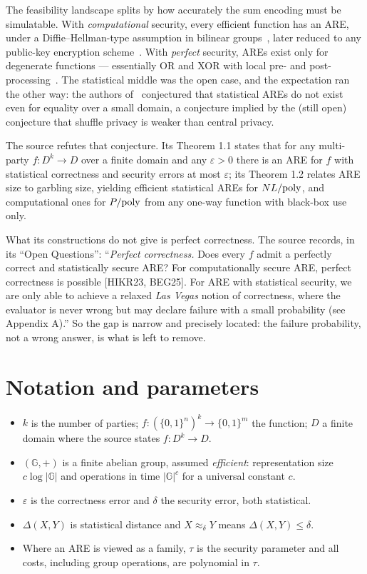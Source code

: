 \documentclass{aicr-conjecture}
\newcommand{\bits}{\{0,1\}}
\newcommand{\eps}{\varepsilon}
\newcommand{\Gr}{\mathbb{G}}
\begin{document}
The feasibility landscape splits by how accurately the sum encoding must
be simulatable. With \emph{computational} security, every efficient
function has an ARE, under a Diffie--Hellman-type assumption in bilinear
groups~\cite{HIKR23}, later reduced to any public-key encryption
scheme~\cite{BEG25}. With \emph{perfect} security, AREs exist only for
degenerate functions --- essentially OR and XOR with local pre- and
post-processing~\cite{HIKR23,Hiw25}. The statistical middle was the open
case, and the expectation ran the other way: the authors
of~\cite{HIKR23} conjectured that statistical AREs do not exist even for
equality over a small domain, a conjecture implied by the (still open)
conjecture that shuffle privacy is weaker than central privacy.

The source refutes that conjecture. Its Theorem 1.1 states that for any
multi-party $f : D^{k} \to D$ over a finite domain and any $\eps > 0$
there is an ARE for $f$ with statistical correctness and security errors
at most $\eps$; its Theorem 1.2 relates ARE size to garbling size,
yielding efficient statistical AREs for $NL/\mathrm{poly}$, and computational
ones for $P/\mathrm{poly}$ from any one-way function with black-box use only.

What its constructions do not give is perfect correctness. The source
records, in its ``Open Questions'': ``\emph{Perfect correctness.} Does
every $f$ admit a perfectly correct and statistically secure ARE\@? For
computationally secure ARE, perfect correctness is possible
[HIKR23, BEG25]. For ARE with statistical security, we are only able to
achieve a relaxed \emph{Las Vegas} notion of correctness, where the
evaluator is never wrong but may declare failure with a small
probability (see Appendix A).'' So the gap is narrow and precisely
located: the failure probability, not a wrong answer, is what is left to
remove.

\section{Notation and parameters}\label{sec:notation}

\begin{itemize}[nosep]
  \item $k$ is the number of parties; $f : (\bits^{n})^{k} \to
    \bits^{m}$ the function; $D$ a finite domain where the source states
    $f : D^{k} \to D$.
  \item $(\Gr, +)$ is a finite abelian group, assumed \emph{efficient}:
    representation size $c \log |\Gr|$ and operations in time
    $|\Gr|^{c}$ for a universal constant $c$.
  \item $\eps$ is the correctness error and $\delta$ the security error,
    both statistical.
  \item $\Delta(X,Y)$ is statistical distance and $X \approx_{\delta} Y$
    means $\Delta(X,Y) \le \delta$.
  \item Where an ARE is viewed as a family, $\tau$ is the security
    parameter and all costs, including group operations, are polynomial
    in $\tau$.
\end{itemize}
\end{document}
